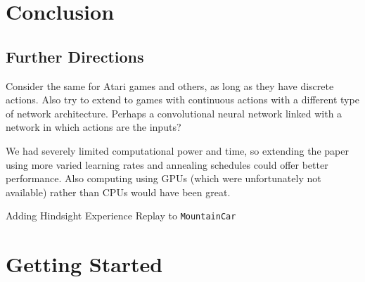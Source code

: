 \documentclass[11pt]{article}
\newcommand{\mc}{\texttt{MountainCar}}
\begin{document}
\section{Conclusion}

\subsection{Further Directions}

Consider the same for Atari games and others, as long as they have discrete actions. Also try to extend to games with continuous actions with a different type of network architecture. Perhaps a convolutional neural network linked with a network in which actions are the inputs?

We had severely limited computational power and time, so extending the paper using more varied learning rates and annealing schedules could offer better performance. Also computing using GPUs (which were unfortunately not available) rather than CPUs would have been great.

Adding Hindsight Experience Replay to \mc

\newpage
{}


\newpage

\appendix

\section{Getting Started}
\label{app:getting_started}
\end{document}
